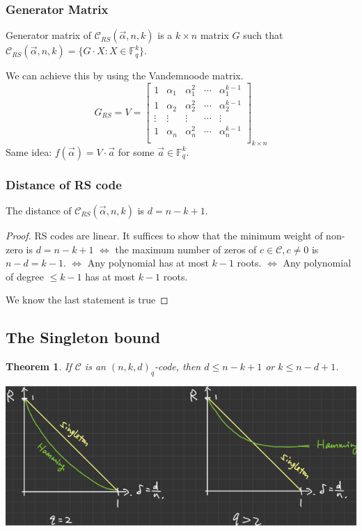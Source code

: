 \documentclass[letterpaper,12pt]{article}
\newtheorem{theorem}{Theorem}
\begin{document}
\subsubsection{Generator Matrix}
Generator matrix of $\mathcal{C}_{RS}(\vec{\alpha},n,k)$ is a $k\times n$
matrix $G$ such that $\mathcal{C}_{RS}(\vec{\alpha},n,k)=\{G\cdot X: X\in
    \mathbb{F}_q^k\}$.

We can achieve this by using the Vandemnoode matrix. \[
    G_{RS}=V=\begin{bmatrix}
        1      & \alpha_1 & \alpha_1^2 & \cdots & \alpha_1^{k-1} \\
        1      & \alpha_2 & \alpha_2^2 & \cdots & \alpha_2^{k-1} \\
        \vdots & \vdots   & \vdots     & \cdots & \vdots         \\
        1      & \alpha_n & \alpha_n^2 & \cdots & \alpha_n^{k-1} \\
    \end{bmatrix}_{k\times n}
\]
Same idea: $f(\vec{\alpha})=V\cdot \vec{a}$ for some $\vec{a}\in
    \mathbb{F}_q^k$.
\subsubsection{Distance of RS code}
The distance of $\mathcal{C}_{RS}(\vec{\alpha},n,k)$ is $d=n-k+1$.
\begin{proof}
    RS codes are linear. It suffices to show that the minimum weight of non-zero is $d=n-k+1$ $\iff$ the maximum number of zeros of $c\in \mathcal{C},c\neq 0$ is $n-d=k-1$. $\iff$ Any polynomial has at most $k-1$ roots. $\iff$ Any polynomial of degree $\le k-1$ has at most $k-1$ roots.

    We know the last statement is true
\end{proof}
\subsection{The Singleton bound}
\begin{theorem}
    If $\mathcal{C}$ is an $(n,k,d)_q$-code, then $d\le n-k+1$ or $k\le n-d+1$.
\end{theorem}
\includegraphics*[scale= 0.8]{./Images/Hamming bound VS Singleton bound.png}
\end{document}
